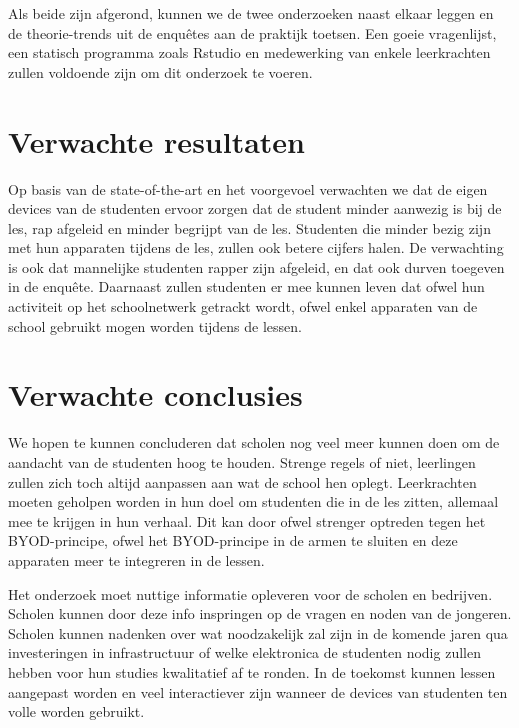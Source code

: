 Als beide zijn afgerond, kunnen we de twee onderzoeken naast elkaar leggen en de theorie-trends uit de enquêtes aan de praktijk toetsen. Een goeie vragenlijst, een statisch programma zoals Rstudio en medewerking van enkele leerkrachten zullen voldoende zijn om dit onderzoek te voeren.

\section{Verwachte resultaten}
\label{sec:verwachte_resultaten}

Op basis van de state-of-the-art en het voorgevoel verwachten we dat de eigen devices van de studenten ervoor zorgen dat de student minder aanwezig is bij de les, rap afgeleid en minder begrijpt van de les. Studenten die minder bezig zijn met hun apparaten tijdens de les, zullen ook betere cijfers halen. De verwachting is ook dat mannelijke studenten rapper zijn afgeleid, en dat ook durven toegeven in de enquête. Daarnaast zullen studenten er mee kunnen leven dat ofwel hun activiteit op het schoolnetwerk getrackt wordt, ofwel enkel apparaten van de school gebruikt mogen worden tijdens de lessen.

\section{Verwachte conclusies}
\label{sec:verwachte_conclusies}

We hopen te kunnen concluderen dat scholen nog veel meer kunnen doen om de aandacht van de studenten hoog te houden. Strenge regels of niet, leerlingen zullen zich toch altijd aanpassen aan wat de school hen oplegt. Leerkrachten moeten geholpen worden in hun doel om studenten die in de les zitten, allemaal mee te krijgen in hun verhaal. Dit kan door ofwel strenger optreden tegen het BYOD-principe, ofwel het BYOD-principe in de armen te sluiten en deze apparaten meer te integreren in de lessen.   

Het onderzoek moet nuttige informatie opleveren voor de scholen en bedrijven. Scholen kunnen door deze info inspringen op de vragen en noden van de jongeren. Scholen kunnen nadenken over wat noodzakelijk zal zijn in de komende jaren qua investeringen in infrastructuur of welke elektronica de studenten nodig zullen hebben voor hun studies kwalitatief af te ronden. In de toekomst kunnen lessen aangepast worden en veel interactiever zijn wanneer de devices van studenten ten volle worden gebruikt. 


